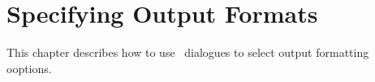 
\chapter{Specifying Output Formats}
\label{cha:uformat}

This chapter describes how to use \Pyb\ dialogues to select output
formatting ooptions.




